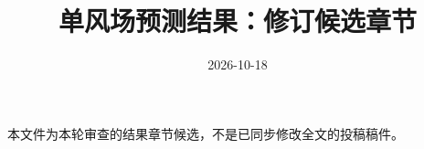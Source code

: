 \documentclass[UTF8,11pt,a4paper,fontset=fandol]{ctexart}
\title{单风场预测结果：修订候选章节}
\author{}\date{2026-10-18}
\begin{document}
\maketitle
\noindent 本文件为本轮审查的结果章节候选，不是已同步修改全文的投稿稿件。

\end{document}
